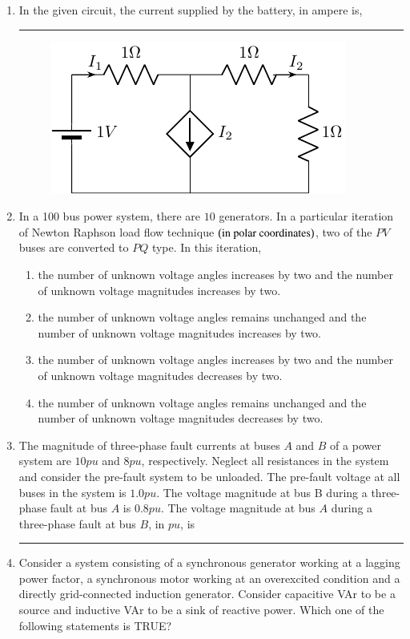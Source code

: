 \documentclass[journal]{IEEEtran}
\begin{document}
\begin{enumerate}
	\item In the given circuit, the current supplied by the battery, in ampere is,\rule{2cm}{0.2pt}
\begin{figure}[H]
			\centering
			\includegraphics[scale=0.75]{figs/q18.png}
			\label{stemplot}
		\end{figure}
	\item In a 100 bus power system, there are $10$ generators. In a particular iteration of Newton Raphson load flow technique $\left(\text{in polar coordinates}\right)$, two of the $PV$ buses are converted to $PQ$ type. In this iteration,
		\begin{enumerate}
		\item  the number of unknown voltage angles increases by two and the number of unknown voltage magnitudes increases by two.
		\item  the number of unknown voltage angles remains unchanged and the number of unknown voltage magnitudes increases by two.
	\item the number of unknown voltage angles increases by two and the number of unknown voltage magnitudes decreases by two.
\item the number of unknown voltage angles remains unchanged and the number of unknown voltage magnitudes decreases by two.
\end{enumerate}

\item The magnitude of three-phase fault currents at buses $A$ and $B$ of a power system are $10 pu$ and $8 pu$, respectively. Neglect all resistances in the system and consider the pre-fault system to be unloaded. The pre-fault voltage at all buses in the system is $1.0 pu$. The voltage magnitude at bus B during a three-phase fault at bus $A$ is $0.8 pu$. The voltage magnitude at bus $A$ during a three-phase fault at bus $B$, in $pu$, is \rule{2cm}{0.2pt}
\item Consider a system consisting of a synchronous generator working at a lagging power factor, a synchronous motor working at an overexcited condition and a directly grid-connected induction generator. Consider capacitive VAr to be a source and inductive VAr to be a sink of reactive power. Which one of the following statements is TRUE? 


\end{enumerate}
\end{document}
